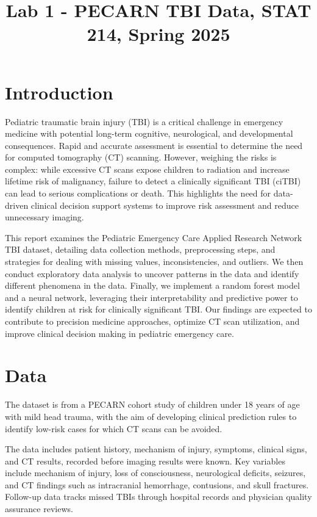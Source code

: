\documentclass[10pt,letterpaper]{article}
\title{Lab 1 - PECARN TBI Data, STAT 214, Spring 2025}
\author{}
\begin{document}
\maketitle

\section{Introduction}\label{introduction}

Pediatric traumatic brain injury (TBI) is a critical challenge in emergency medicine with potential long-term cognitive, neurological, and developmental consequences. Rapid and accurate assessment is essential to determine the need for computed tomography (CT) scanning. However, weighing the risks is complex: while excessive CT scans expose children to radiation and increase lifetime risk of malignancy, failure to detect a clinically significant TBI (ciTBI) can lead to serious complications or death. This highlights the need for data-driven clinical decision support systems to improve risk assessment and reduce unnecessary imaging.

This report examines the Pediatric Emergency Care Applied Research Network TBI dataset, detailing data collection methods, preprocessing steps, and strategies for dealing with missing values, inconsistencies, and outliers. We then conduct exploratory data analysis to uncover patterns in the data and identify different phenomena in the data. Finally, we implement a random forest model and a neural network, leveraging their interpretability and predictive power to identify children at risk for clinically significant TBI. Our findings are expected to contribute to precision medicine approaches, optimize CT scan utilization, and improve clinical decision making in pediatric emergency care.

\section{Data}\label{data}

The dataset is from a PECARN cohort study of children under 18 years of age with mild head trauma, with the aim of developing clinical prediction rules to identify low-risk cases for which CT scans can be avoided.

The data includes patient history, mechanism of injury, symptoms, clinical signs, and CT results, recorded before imaging results were known. Key variables include mechanism of injury, loss of consciousness, neurological deficits, seizures, and CT findings such as intracranial hemorrhage, contusions, and skull fractures. Follow-up data tracks missed TBIs through hospital records and physician quality assurance reviews.
\end{document}
